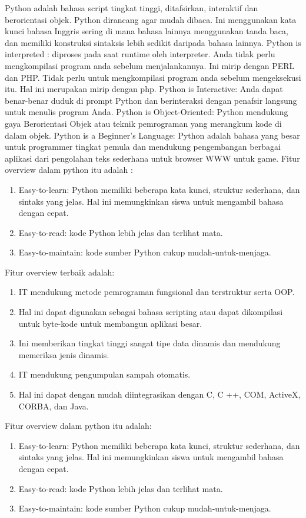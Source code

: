 Python adalah bahasa script tingkat tinggi, ditafsirkan, interaktif dan berorientasi objek. Python dirancang agar mudah dibaca. Ini menggunakan kata kunci bahasa Inggris sering di mana bahasa lainnya menggunakan tanda baca, dan memiliki konstruksi sintaksis lebih sedikit daripada bahasa lainnya.
Python is interpreted : diproses pada saat runtime oleh interpreter. Anda tidak perlu mengkompilasi program anda sebelum menjalankannya. Ini mirip dengan PERL dan PHP.
Tidak perlu untuk mengkompilasi program anda sebelum mengeksekusi itu. Hal ini merupakan mirip dengan php.
Python is Interactive: Anda dapat benar-benar duduk di prompt Python dan berinteraksi dengan penafsir langsung untuk menulis program Anda.
Python is Object-Oriented: Python mendukung gaya Berorientasi Objek atau teknik pemrograman yang merangkum kode di dalam objek.
Python is a Beginner's Language: Python adalah bahasa yang besar untuk programmer tingkat pemula dan mendukung pengembangan berbagai aplikasi dari pengolahan teks sederhana untuk browser WWW untuk game.
Fitur overview dalam python itu adalah :
\begin {enumerate}
\item Easy-to-learn: Python memiliki beberapa kata kunci, struktur sederhana, dan sintaks yang jelas. Hal ini memungkinkan siswa untuk mengambil bahasa dengan cepat.
\item Easy-to-read: kode Python lebih jelas dan terlihat mata.
\item Easy-to-maintain: kode sumber Python cukup mudah-untuk-menjaga.
\end {enumerate}

Fitur overview terbaik adalah:
\begin {enumerate}
\item IT mendukung metode pemrograman fungsional dan terstruktur serta OOP.
\item Hal ini dapat digunakan sebagai bahasa scripting atau dapat dikompilasi untuk byte-kode untuk membangun aplikasi besar.
\item Ini memberikan tingkat tinggi sangat tipe data dinamis dan mendukung memeriksa jenis dinamis.
\item IT mendukung pengumpulan sampah otomatis.
\item Hal ini dapat dengan mudah diintegrasikan dengan C, C ++, COM, ActiveX, CORBA, dan Java.
\end {enumerate}

Fitur overview dalam python itu adalah:
\begin {enumerate}
\item Easy-to-learn: Python memiliki beberapa kata kunci, struktur sederhana, dan sintaks yang jelas. $  $Hal ini memungkinkan siswa untuk mengambil bahasa dengan cepat.
\item Easy-to-read: kode Python lebih jelas dan terlihat mata.
\item Easy-to-maintain: kode sumber Python cukup mudah-untuk-menjaga.
\end {enumerate}


